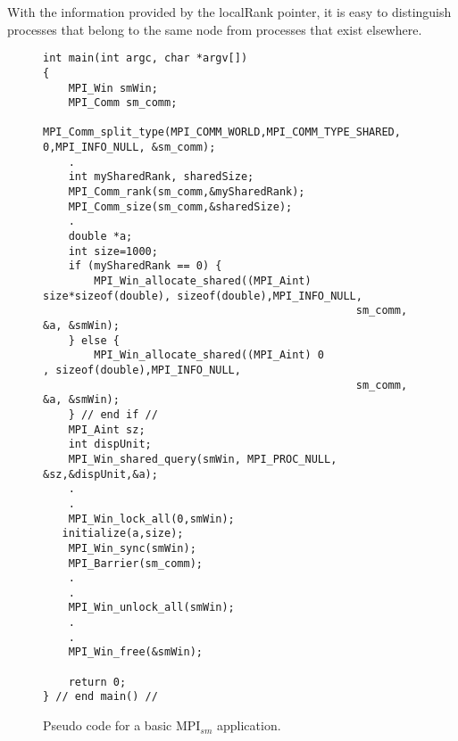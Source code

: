 \medskip

With the information provided by the localRank pointer, it is easy to distinguish processes that belong to the same node from processes that exist elsewhere.



\begin{figure} [t!]
\centering
\captionsetup{justification=centering, singlelinecheck=false}
    
\begin{lstlisting}[style=CStyle]
int main(int argc, char *argv[])
{
    MPI_Win smWin;
    MPI_Comm sm_comm;
    MPI_Comm_split_type(MPI_COMM_WORLD,MPI_COMM_TYPE_SHARED, 0,MPI_INFO_NULL, &sm_comm);
    .
    int mySharedRank, sharedSize;
    MPI_Comm_rank(sm_comm,&mySharedRank);
    MPI_Comm_size(sm_comm,&sharedSize);
    .
    double *a;
    int size=1000;
    if (mySharedRank == 0) {
        MPI_Win_allocate_shared((MPI_Aint) size*sizeof(double), sizeof(double),MPI_INFO_NULL,
                                                 sm_comm, &a, &smWin);
    } else {
        MPI_Win_allocate_shared((MPI_Aint) 0                 , sizeof(double),MPI_INFO_NULL,
                                                 sm_comm, &a, &smWin);
    } // end if //                            
    MPI_Aint sz;
    int dispUnit;
    MPI_Win_shared_query(smWin, MPI_PROC_NULL, &sz,&dispUnit,&a);
    .
    .
    MPI_Win_lock_all(0,smWin);
   initialize(a,size);
    MPI_Win_sync(smWin);
    MPI_Barrier(sm_comm);
    .
    .
    MPI_Win_unlock_all(smWin);
    .
    .
    MPI_Win_free(&smWin);
    
    return 0;
} // end main() //
\end{lstlisting}    
\caption{Pseudo code for a basic MPI$_{sm}$ application.}
\label{fig:PseudoCode1}
\end{figure}


